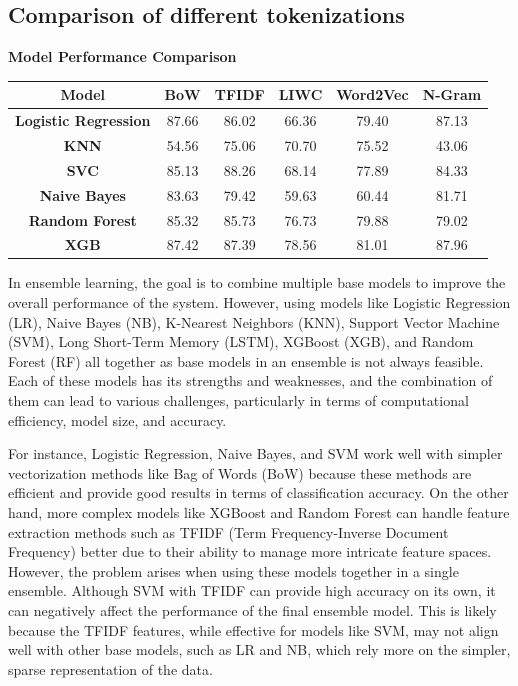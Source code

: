 \subsection{Comparison of different tokenizations}
\begin{center}
    \textbf{Model Performance Comparison} \\[0.5em]
    \begin{tabular}{|c|c|c|c|c|c|}
        \hline
        \textbf{Model} & \textbf{BoW} & \textbf{TFIDF} & \textbf{LIWC} & \textbf{Word2Vec} & \textbf{N-Gram} \\ \hline
        \textbf{Logistic Regression} & 87.66 & 86.02 & 66.36 & 79.40 & 87.13 \\ \hline
        \textbf{KNN} & 54.56 & 75.06 & 70.70 & 75.52 & 43.06 \\ \hline
        \textbf{SVC} & 85.13 & 88.26 & 68.14 & 77.89 & 84.33 \\ \hline
        \textbf{Naive Bayes} & 83.63 & 79.42 & 59.63 & 60.44 & 81.71 \\ \hline
        \textbf{Random Forest} & 85.32 & 85.73 & 76.73 & 79.88 & 79.02 \\ \hline
        \textbf{XGB} & 87.42 & 87.39 & 78.56 & 81.01 & 87.96 \\ \hline
    \end{tabular}
\end{center}

\noindent
In ensemble learning, the goal is to combine multiple base models to improve the overall performance of the system. However, using models like Logistic Regression (LR), Naive Bayes (NB), K-Nearest Neighbors (KNN), Support Vector Machine (SVM), Long Short-Term Memory (LSTM), XGBoost (XGB), and Random Forest (RF) all together as base models in an ensemble is not always feasible. Each of these models has its strengths and weaknesses, and the combination of them can lead to various challenges, particularly in terms of computational efficiency, model size, and accuracy.

\vspace{1em}

\noindent
For instance, Logistic Regression, Naive Bayes, and SVM work well with simpler vectorization methods like Bag of Words (BoW) because these methods are efficient and provide good results in terms of classification accuracy. On the other hand, more complex models like XGBoost and Random Forest can handle feature extraction methods such as TFIDF (Term Frequency-Inverse Document Frequency) better due to their ability to manage more intricate feature spaces. However, the problem arises when using these models together in a single ensemble. Although SVM with TFIDF can provide high accuracy on its own, it can negatively affect the performance of the final ensemble model. This is likely because the TFIDF features, while effective for models like SVM, may not align well with other base models, such as LR and NB, which rely more on the simpler, sparse representation of the data.

